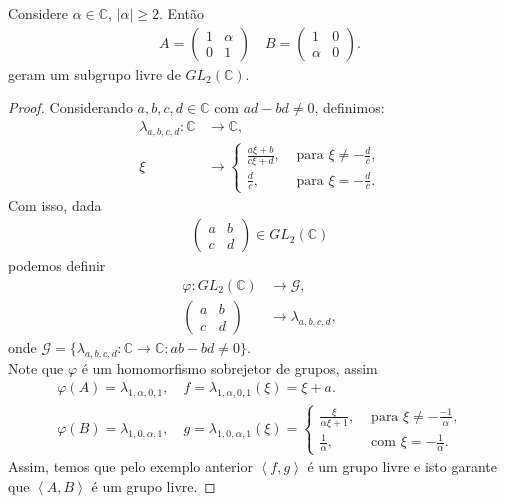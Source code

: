\begin{theorem}[Sanov]
  Considere $\alpha\in\mathbb{C}$, $|\alpha|\geq 2$. Então
  \begin{align*}
    A=\begin{pmatrix}
      1 & \alpha \\
      0 & 1
    \end{pmatrix}\quad B=\begin{pmatrix}
      1 & 0 \\
      \alpha & 0
    \end{pmatrix}.
  \end{align*}
  geram um subgrupo livre de $GL_2(\mathbb{C})$.
\end{theorem}
\begin{proof}
  Considerando $a,b,c,d\in\mathbb{C}$ com $ad-bd\neq 0$, definimos:
  \begin{align*}
    \lambda_{a,b,c,d}:\mathbb{C}&\to\mathbb{C},\\
    \xi &\to \begin{cases}
      \frac{a\xi+b}{c\xi+d}, &\text{ para } \xi\neq-\frac{d}{c} \text{,} \\
      \frac{d}{c}, &\text{ para } \xi=-\frac{d}{c}.
    \end{cases}
  \end{align*}
  Com isso, dada 
  \begin{align*}
    \begin{pmatrix}
      a & b \\
      c & d
    \end{pmatrix}\in GL_{2}(\mathbb{C})
  \end{align*}
  podemos definir
  \begin{align*}
    \varphi:GL_{2}(\mathbb{C})&\to\mathcal{G},\\
    \begin{pmatrix}
      a & b \\
      c & d
    \end{pmatrix}&\to \lambda_{a,b,c,d},
  \end{align*}
  onde $\mathcal{G}=\{\lambda_{a,b,c,d}:\mathbb{C}\to\mathbb{C}:ab-bd\neq 0\}$.\\
  Note que $\varphi$ é um homomorfismo sobrejetor de grupos, assim
  \begin{align*}
    \varphi(A)=\lambda_{1,\alpha,0,1},\quad f=\lambda_{1,\alpha,0,1}(\xi)=\xi+a.\\
    \varphi(B)=\lambda_{1,0,\alpha,1},\quad g=\lambda_{1,0,\alpha,1}(\xi)=\begin{cases}
      \frac{\xi}{\alpha\xi+1}, &\text{ para } \xi\neq-\frac{-1}{\alpha} \text{,} \\
      \frac{1}{\alpha}, &\text{ com } \xi=-\frac{1}{\alpha}.
    \end{cases}
  \end{align*}
  Assim, temos que pelo exemplo anterior $\left\langle f,g \right\rangle$ é um grupo livre e isto garante que $\left\langle A,B \right\rangle$ é um grupo livre.
\end{proof}
